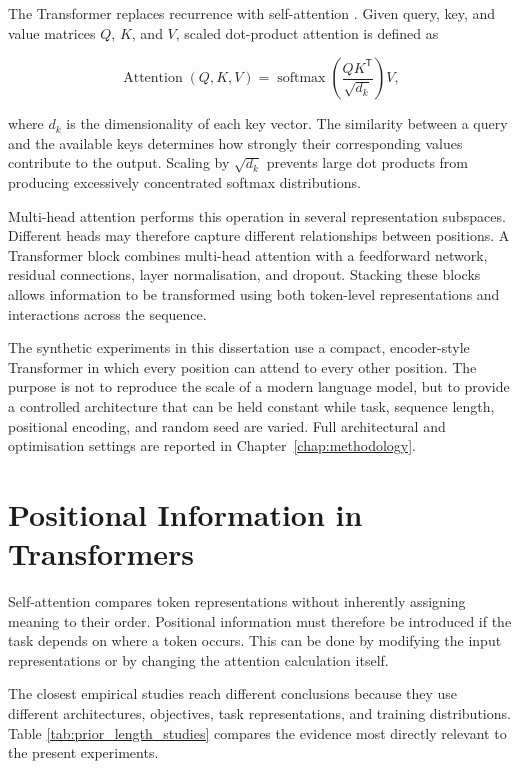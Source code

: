 \documentclass[
    author={Aanchala Ravindra Bhongade},
    supervisor={Dr. Fernando Moreno-Pino},
    degree={MSc},
    title={Length Generalisation in Transformer-Based Sequence Models: Failure Taxonomy and Mitigation Strategies},
    subtitle={},
    type={},
    year={2026}
]{dissertation}
\begin{document}
The Transformer replaces recurrence with self-attention
\cite{vaswani2017attention}. Given query, key, and value matrices
$Q$, $K$, and $V$, scaled dot-product attention is defined as

\begin{equation}
\operatorname{Attention}(Q,K,V)
=
\operatorname{softmax}
\left(
\frac{QK^{\mathsf{T}}}{\sqrt{d_k}}
\right)V,
\label{eq:scaled_dot_product_attention}
\end{equation}

\noindent
where $d_k$ is the dimensionality of each key vector. The similarity between a query and the available keys determines how strongly their corresponding values contribute to the output. Scaling by $\sqrt{d_k}$ prevents large dot products from producing excessively concentrated softmax distributions.

Multi-head attention performs this operation in several representation subspaces. Different heads may therefore capture different relationships between positions. A Transformer block combines multi-head attention with a feedforward network, residual connections, layer normalisation, and dropout. Stacking these blocks allows information to be transformed using both token-level representations and interactions across the sequence.

The synthetic experiments in this dissertation use a compact, encoder-style Transformer in which every position can attend to every other position. The purpose is not to reproduce the scale of a modern language model, but to provide a controlled architecture that can be held constant while task, sequence length, positional encoding, and random seed are varied. Full architectural and optimisation settings are reported in Chapter~\ref{chap:methodology}.

\section{Positional Information in Transformers}

Self-attention compares token representations without inherently assigning meaning to their order. Positional information must therefore be introduced if the task depends on where a token occurs. This can be done by modifying the input representations or by changing the attention calculation itself.

The closest empirical studies reach different conclusions because they use different architectures, objectives, task representations, and training distributions. Table \ref{tab:prior_length_studies} compares the evidence most directly relevant to the present experiments.
\end{document}
